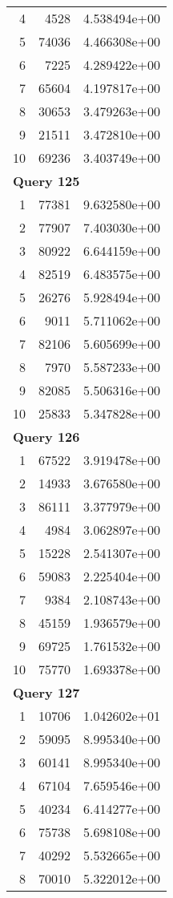 \begin{longtable}[{p}]{@{}rrp{}@{}}
4 & 4528 & 4.538494e+00 \\
5 & 74036 & 4.466308e+00 \\
6 & 7225 & 4.289422e+00 \\
7 & 65604 & 4.197817e+00 \\
8 & 30653 & 3.479263e+00 \\
9 & 21511 & 3.472810e+00 \\
10 & 69236 & 3.403749e+00 \\
\midrule
\multicolumn{3}{l}{\bfseries Query 125} \\
1 & 77381 & 9.632580e+00 \\
2 & 77907 & 7.403030e+00 \\
3 & 80922 & 6.644159e+00 \\
4 & 82519 & 6.483575e+00 \\
5 & 26276 & 5.928494e+00 \\
6 & 9011 & 5.711062e+00 \\
7 & 82106 & 5.605699e+00 \\
8 & 7970 & 5.587233e+00 \\
9 & 82085 & 5.506316e+00 \\
10 & 25833 & 5.347828e+00 \\
\midrule
\multicolumn{3}{l}{\bfseries Query 126} \\
1 & 67522 & 3.919478e+00 \\
2 & 14933 & 3.676580e+00 \\
3 & 86111 & 3.377979e+00 \\
4 & 4984 & 3.062897e+00 \\
5 & 15228 & 2.541307e+00 \\
6 & 59083 & 2.225404e+00 \\
7 & 9384 & 2.108743e+00 \\
8 & 45159 & 1.936579e+00 \\
9 & 69725 & 1.761532e+00 \\
10 & 75770 & 1.693378e+00 \\
\midrule
\multicolumn{3}{l}{\bfseries Query 127} \\
1 & 10706 & 1.042602e+01 \\
2 & 59095 & 8.995340e+00 \\
3 & 60141 & 8.995340e+00 \\
4 & 67104 & 7.659546e+00 \\
5 & 40234 & 6.414277e+00 \\
6 & 75738 & 5.698108e+00 \\
7 & 40292 & 5.532665e+00 \\
8 & 70010 & 5.322012e+00 \\

\end{longtable}
